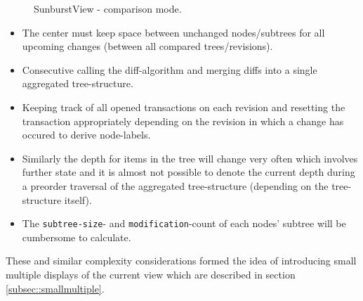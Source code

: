 \begin{figure}[tb]
\caption{\label{fig:sunburst} SunburstView - comparison mode.}
\end{figure}

\begin{itemize}
\item The center must keep space between unchanged nodes/subtrees for all upcoming changes (between all compared trees/revisions).
\item Consecutive calling the diff-algorithm and merging diffs into a single aggregated tree-structure.
\item Keeping track of all opened transactions on each revision and resetting the transaction appropriately depending on the revision in which a change has occured to derive node-labels.
\item Similarly the depth for items in the tree will change very often which involves further state and it is almost not possible to denote the current depth during a preorder traversal of the aggregated tree-structure (depending on the tree-structure itself).
\item The \texttt{subtree-size}- and \texttt{modification}-count of each nodes' subtree will be cumbersome to calculate.
\end{itemize}

These and similar complexity considerations formed the idea of introducing small multiple displays of the current view which are described in section \ref{subsec::smallmultiple}.

